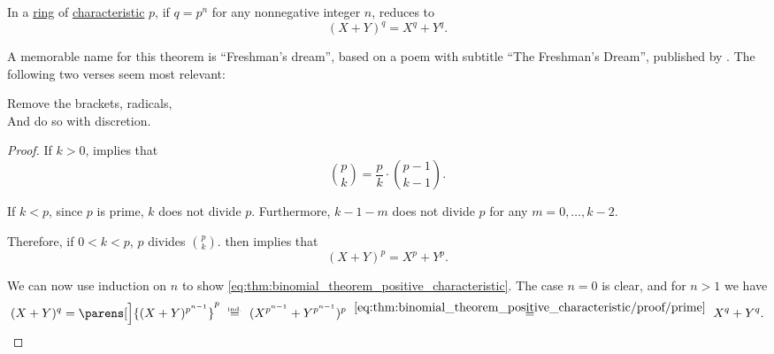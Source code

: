 \begin{corollary}\label{thm:binomial_theorem_positive_characteristic}
  In a \hyperref[def:ring]{ring} of \hyperref[def:ring_characteristic]{characteristic} \( p \), if \( q = p^n \) for any nonnegative integer \( n \),  reduces to
  \begin{equation}\label{eq:thm:binomial_theorem_positive_characteristic}
    (X + Y)^q = X^q + Y^q.
  \end{equation}
\end{corollary}
\begin{comments}
  \item A memorable name for this theorem is \enquote{Freshman's dream}, based on a poem with subtitle \enquote{The Freshman's Dream}, published by . The following two verses seem most relevant:
  \begin{displayquote}
    Remove the brackets, radicals, \\
    And do so with discretion.
  \end{displayquote}
\end{comments}
\begin{proof}
  If \( k > 0 \),  implies that
  \begin{equation*}
    \binom p k = \frac p k \cdot \binom {p - 1} {k - 1}.
  \end{equation*}

  If \( k < p \), since \( p \) is prime, \( k \) does not divide \( p \). Furthermore, \( k - 1 - m \) does not divide \( p \) for any \( m = 0, \ldots, k - 2 \).

  Therefore, if \( 0 < k < p \), \( p \) divides \( \binom p k \).  then implies that
  \begin{equation}\label{eq:thm:binomial_theorem_positive_characteristic/proof/prime}
    (X + Y)^p = X^p + Y^p.
  \end{equation}

  We can now use induction on \( n \) to show \eqref{eq:thm:binomial_theorem_positive_characteristic}. The case \( n = 0 \) is clear, and for \( n > 1 \) we have
  \begin{equation*}
    (X + Y)^q
    =
    \parens[\Big]{ (X + Y)^{p^{n-1}} }^p
    \reloset {\T{ind.}} =
    (X^{p^{n-1}} + Y^{p^{n-1}})^p
    \reloset {\eqref{eq:thm:binomial_theorem_positive_characteristic/proof/prime}} =
    X^q + Y^q.
  \end{equation*}
\end{proof}

